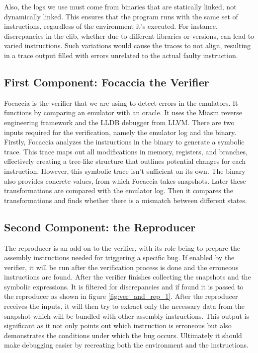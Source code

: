 Also, the logs we use must come from binaries that are statically linked, not dynamically linked.
This ensures that the program runs with the same set of instructions, regardless of the environment it's executed.
For instance, discrepancies in the \ac{clib}, whether due to different libraries or versions, can lead to varied instructions.
Such variations would cause the traces to not align, resulting in a trace output filled with errors unrelated to the actual faulty instruction.

\subsection{First Component: Focaccia the Verifier}

Focaccia is the verifier that we are using to detect errors in the emulators.
It functions by comparing an emulator with an oracle.
It uses the Miasm reverse engineering framework and the LLDB debugger from LLVM. 
There are two inputs required for the verification, namely the emulator log and the binary.
Firstly, Focaccia analyzes the instructions in the binary to generate a symbolic trace.
This trace maps out all modifications in memory, registers, and branches, effectively creating a tree-like structure that outlines potential changes for each instruction.
However, this symbolic trace isn't sufficient on its own. 
The binary also provides concrete values, from which Focaccia takes snapshots.
Later these transformations are compared with the emulator log.
Then it compares the transformations and finds whether there is a mismatch between different states.

\subsection{Second Component: the Reproducer}
The reproducer is an add-on to the verifier, with its role being to prepare the assembly instructions needed for triggering a specific bug. 
If enabled by the verifier, it will be run after the verification process is done and the erroneous instructions are found.
After the verifier finishes collecting the snapshots and the symbolic expressions.
It is filtered for discrepancies and if found it is passed to the reproducer as shown in figure \ref{fig:ver_and_rep_1}.
After the reproducer receives the inputs, it will then try to extract only the necessary data from the snapshot which will be bundled with other assembly instructions.
This output is significant as it not only points out which instruction is erroneous but also demonstrates the conditions under which the bug occurs.
Ultimately it should make debugging easier by recreating both the environment and the instructions.


